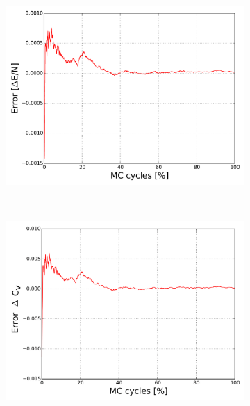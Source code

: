 \begin{figure}[H]
	\centering
	\begin{subfigure}{0.5\textwidth}
		\centering
		\includegraphics[width=\linewidth]{result/bilder/2x2/energyerror22}
		\caption{}
	\end{subfigure}%
	~ 
	\begin{subfigure}{0.5\textwidth}
		\centering
		\includegraphics[width=\linewidth]{result/bilder/2x2/cverror22_}
		\caption{}
	\end{subfigure}
	\begin{subfigure}{0.5\textwidth}
		\centering

\end{subfigure}
\end{figure}
